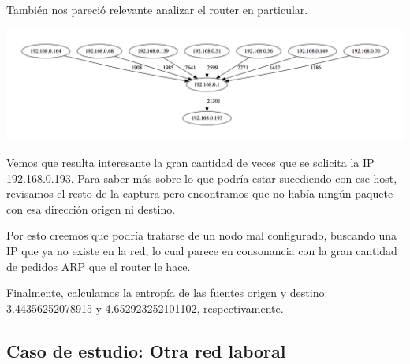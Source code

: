 También nos pareció relevante analizar el router en particular.\newline

\includegraphics[scale=0.3]{graphics/t-work-router-1000w.png}

Vemos que resulta interesante la gran cantidad de veces que se solicita la IP 192.168.0.193. Para saber más sobre lo que podría estar sucediendo con ese host, revisamos el resto de la captura pero encontramos que no había ningún paquete con esa dirección origen ni destino.\newline

Por esto creemos que podría tratarse de un nodo mal configurado, buscando una IP que ya no existe en la red, lo cual parece en consonancia con la gran cantidad de pedidos ARP que el router le hace.\newline

Finalmente, calculamos la entropía de las fuentes origen y destino: 3.44356252078915 y 4.652923252101102, respectivamente.\newline


\subsection{Caso de estudio: Otra red laboral}

